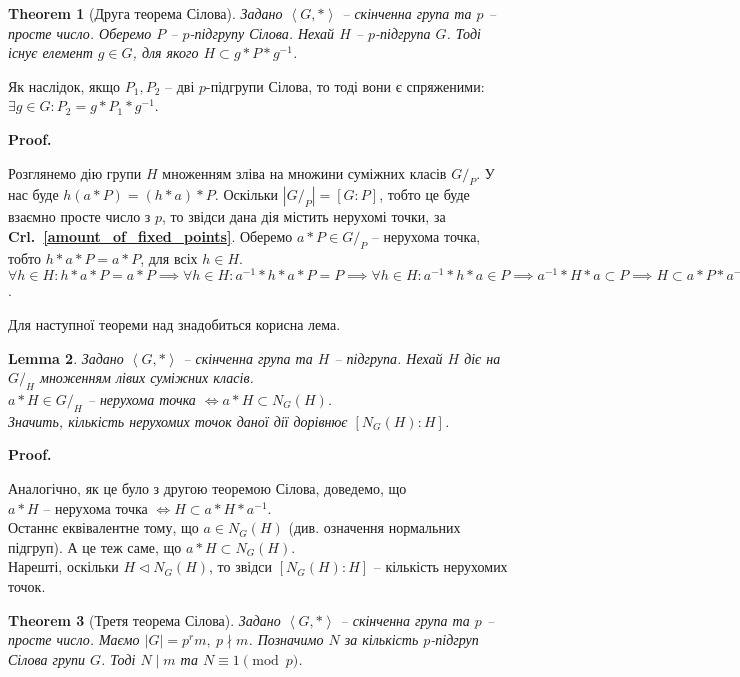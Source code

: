 \documentclass[a4paper, 10pt]{article}
\makeatletter
\theoremstyle{theoremdd}
\newtheorem{theorem}{Theorem}[subsection]
\theoremstyle{theoremdd}
\theoremstyle{theoremdd}
\theoremstyle{theoremdd}
\theoremstyle{theoremdd}
\theoremstyle{theoremdd}
\theoremstyle{theoremdd}
\theoremstyle{theoremdd}
\theoremstyle{theoremdd}
\theoremstyle{theoremdd}
\theoremstyle{theoremdd}
\theoremstyle{theoremdd}
\theoremstyle{theoremdd}
\newtheorem{lemma}[theorem]{Lemma}
\theoremstyle{theoremdd}
\theoremstyle{theoremdd}
\renewenvironment{proof}[1][Proof.\\]{\par
\pushQED{\hfill \qed}%
\normalfont \topsep6\p@\@plus6\p@\relax
\trivlist
\item\relax
{\bfseries
#1\@addpunct{.}}\hspace\labelsep\ignorespaces
}{%
\popQED\endtrivlist\@endpefalse
}
\newcommand\crlref[1]{\textbf{Crl.~\ref{#1}}}
\makeatother
\begin{document}
\begin{theorem}[Друга теорема Сілова]
Задано $\left< G, * \right>$ -- скінченна група та $p$ -- просте число. Оберемо $P$ -- $p$-підгрупу Сілова. Нехай $H$ -- $p$-підгрупа $G$. Тоді існує елемент $g \in G$, для якого $H \subset g*P*g^{-1}$.
\end{theorem}

Як наслідок, якщо $P_1,P_2$ -- дві $p$-підгрупи Сілова, то тоді вони є спряженими: $\exists g \in G: P_2 = g*P_1*g^{-1}$.

\begin{proof}
Розглянемо дію групи $H$ множенням зліва на множини суміжних класів $G/_P$. У нас буде $h (a*P) = (h*a)*P$. Оскільки $|G/_P| = [G:P]$, тобто це буде взаємно просте число з $p$, то звідси дана дія містить нерухомі точки, за \crlref{amount_of_fixed_points}. Оберемо $a*P \in G/_P$ -- нерухома точка, тобто $h*a*P = a*P$, для всіх $h \in H$.\\
$\forall h \in H: h*a*P = a*P \implies \forall h \in H: a^{-1}*h*a*P = P \implies \forall h \in H: a^{-1}*h*a \in P \implies a^{-1}*H*a \subset P \implies H \subset a*P*a^{-1}$.
\end{proof}

Для наступної теореми над знадобиться корисна лема.
\begin{lemma}
Задано $\left< G, *\right>$ -- скінченна група та $H$ -- підгрупа. Нехай $H$ діє на $G/_H$ множенням лівих суміжних класів.\\
$a*H \in G/_H$ -- нерухома точка $\iff a*H \subset N_G(H)$.\\
Значить, кількість нерухомих точок даної дії дорівнює $[N_G(H):H]$.
\end{lemma}

\begin{proof}
Аналогічно, як це було з другою теоремою Сілова, доведемо, що\\
$a*H$ -- нерухома точка $\iff H \subset a*H*a^{-1}$.\\
Останнє еквівалентне тому, що $a \in N_G(H)$ (див. означення нормальних підгруп). А це теж саме, що $a*H \subset N_G(H)$.\\
Нарешті, оскільки $H \triangleleft N_G(H)$, то звідси $[N_G(H):H]$ -- кількість нерухомих точок.
\end{proof}

\begin{theorem}[Третя теорема Сілова]
Задано $\left< G, *\right>$ -- скінченна група та $p$ -- просте число. Маємо $|G| = p^r m,\ p \nmid m$. Позначимо $N$ за кількість $p$-підгруп Сілова групи $G$. Тоді $N \mid m$ та $N \equiv 1 \pmod p$.
\end{theorem}
\end{document}
